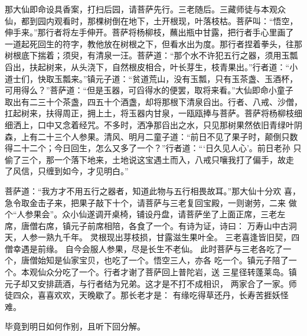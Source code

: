那大仙即命设具香案，打扫后园，请菩萨先行。三老随后。三藏师徒与本观众
仙，都到园内观看时，那棵树倒在地下，土开根现，叶落枝枯。菩萨叫：“悟空，
伸手来。”那行者将左手伸开。菩萨将杨柳枝，蘸出瓶中甘露，把行者手心里画了
一道起死回生的符字，教他放在树根之下，但看水出为度。那行者捏着拳头，往那
树根底下揣着；须臾，有清泉一汪。菩萨道：“那个水不许犯五行之器，须用玉瓢
舀出，扶起树来，从头浇下，自然根皮相合，叶长芽生，枝青果出。”行者道：“小
道士们，快取玉瓢来。”镇元子道：“贫道荒山，没有玉瓢，只有玉茶盏、玉酒杯，
可用得么？”菩萨道：“但是玉器，可舀得水的便罢，取将来看。”大仙即命小童子
取出有二三十个茶盏，四五十个酒盏，却将那根下清泉舀出。行者、八戒、沙僧，
扛起树来，扶得周正，拥上土，将玉器内甘泉，一瓯瓯捧与菩萨。菩萨将杨柳枝细
细洒上，口中又念着经咒。不多时，洒净那舀出之水，只见那树果然依旧青绿叶阴
森，上有二十三个人参果。清风、明月二童子道：“前日不见了果子时，颠倒只数
得二十二个；今日回生，怎么又多了一个？”行者道：“‘日久见人心’。前日老孙
只偷了三个，那一个落下地来，土地说这宝遇土而入，八戒只嚷我打了偏手，故走
了风信，只缠到如今，才见明白。”

菩萨道：“我方才不用五行之器者，知道此物与五行相畏故耳。”那大仙十分欢
喜，急令取金击子来，把果子敲下十个，请菩萨与三老复回宝殿，一则谢劳，二来
做个“人参果会”。众小仙遂调开桌椅，铺设丹盘，请菩萨坐了上面正席，三老左
席，唐僧右席，镇元子前席相陪，各食了一个。有诗为证，诗曰：
万寿山中古洞天，人参一熟九千年。
灵根现出芽枝损，甘露滋生果叶全。
三老喜逢皆旧契，四僧幸遇是前缘。
自今会服人参果，尽是长生不老仙。
此时菩萨与三老各吃了一个，唐僧始知是仙家宝贝，也吃了一个。悟空三人，亦各
吃一个。镇元子陪了一个。本观仙众分吃了一个。行者才谢了菩萨回上普陀岩，送
三星径转蓬莱岛。镇元子却又安排蔬酒，与行者结为兄弟。这才是不打不成相识，
两家合了一家。师徒四众，喜喜欢欢，天晚歇了。那长老才是：
有缘吃得草还丹，长寿苦捱妖怪难。

毕竟到明日如何作别，且听下回分解。